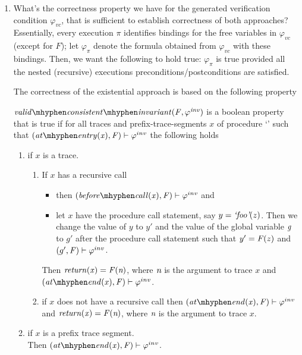 \begin{enumerate}
\begin{enumerate}
\item What's the correctness property we have for the generated verification
condition $\varphi_{vc}$, that is sufficient to establish correctness of both approaches?
Essentially, every execution $\pi$ identifies bindings for the free variables in $\varphi_{vc}$ (except for $F$);
let $\varphi_\pi$ denote the formula obtained from $\varphi_{vc}$ with these bindings.
Then, we want the following to hold true: $\varphi_\pi$ is true provided all the
nested (recursive) executions preconditions/postconditions are satisfied.

The correctness of the existential approach is based on the following property



\begin{definition}
  \label{def:validConsistentInvariant}
  $\\\vci{\F}{\inv}$ is a boolean property that is true if for all
  traces and prefix-trace-segments $x$ of procedure `\foo' such that
  $(\atEntry{x}, \F) \satisfies \inv$ the following holds

  \begin{enumerate}
  \item if $x$ is a trace.
    \begin{enumerate}
    \item If $x$ has a recursive call
      \begin{itemize}
      \item then $(\beforeCall{x}, \F) \satisfies \inv$ and
      \item let $x$ have the procedure call statement, say $y =
        \textit{`foo'}(z)$. Then we change the value of $y$ to $y'$ and the
        value of the global variable $\textit{g}$ to $g'$ after the procedure
        call statement such that $y' = \mathit{F}(z)$ and $(g', \mathit{F})
        \vdash \varphi^{inv}$.
      \end{itemize}
      Then $\mathit{return(x)} = \mathit{F}(\textit{n})$, where $\textit{n}$ is the argument to
      trace $x$ and $(\atEnd{x}, \F) \satisfies \inv$.
    \item if $x$ does not have a recursive call
      then $(\atEnd{x}, \F) \satisfies \inv$ and $\mathit{return(x)} =
      \mathit{F}(\textit{n})$, where $\textit{n}$ is the argument to trace $x$.
    \end{enumerate}
  \item if $x$ is a prefix trace segment.\\
    Then $(\atEnd{x}, \F) \satisfies \inv$.
  \end{enumerate}
\end{definition}



\end{enumerate}
\end{enumerate}
